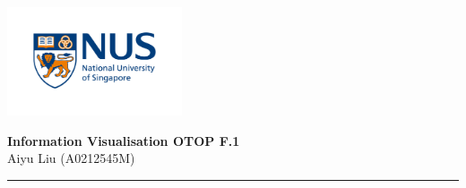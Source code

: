 \begin{minipage}[b]{1.0\linewidth}

\vspace*{-20.5ex}

\hspace*{-0.9cm}\includegraphics[height=32mm]{n}

\vspace*{-18ex}
\begin{center}
    {\Large \bf Information Visualisation OTOP F.1}\\
    \vspace*{2ex}
    { Aiyu Liu (A0212545M)} \vspace*{0ex} \\
\end{center}
\vspace*{1pt}
{\color{blue}\hrule}
\end{minipage}
